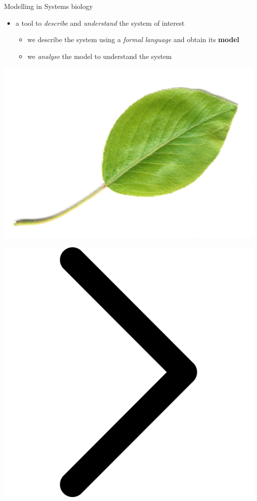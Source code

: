 \documentclass[10pt]{beamer}
\begin{document}
\begin{frame}[fragile]{Modelling in Systems biology}

\begin{itemize}
	\item a tool to \emph{describe} and \emph{understand} the system of interest
	\begin{itemize}
		\item we describe the system using a \emph{formal language} and obtain its \textbf{model}
		\item we \emph{analyse} the model to understand the system
	\end{itemize}
\end{itemize}

\hfill
\begin{minipage}{0.3\textwidth}
\begin{center}
\includegraphics[scale=0.5]{pics/real_leaf}
\end{center}
\end{minipage}
\hfill
\begin{minipage}{0.1\textwidth}
\begin{center}
\includegraphics[scale=0.06]{pics/next.png}

\end{center}
\end{minipage}
\end{frame}
\end{document}
